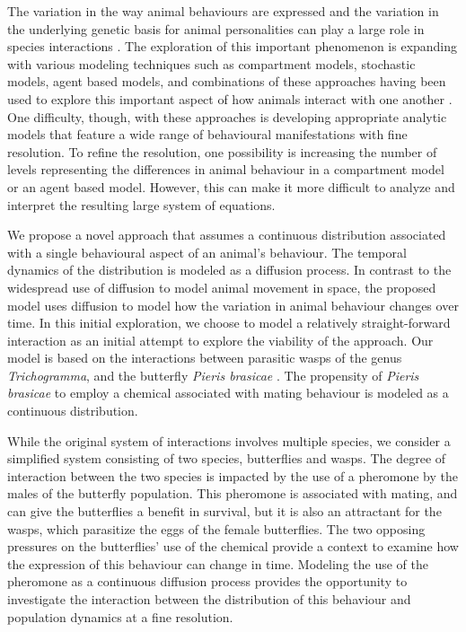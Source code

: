 \documentclass[review,authoryear]{elsarticle}
\begin{document}
The variation in the way animal behaviours are expressed and the variation in the underlying genetic basis for animal personalities can play a large role in species interactions \citep{doi:10.1111/j.1461-0248.2010.01536.x,doi:10.1086/687235,mierzejewski_horn_luong_2019,SANTICCHIA20191,doi:10.1098/rspb.2014.1016,FARINE2015609,sibbald2009individual,kurvers2011effect,modlmeier2012diverse,doi:10.1037/0735-7036.107.3.250}.   The exploration of this important phenomenon is expanding with various modeling techniques such as compartment models, stochastic
models, agent based models, and combinations of these
approaches having been used to explore this important aspect of how animals interact with one another \citep{Keeling65,doi:10.1086/687235,doi:10.1098/rspb.2001.1599,SuperspreadingLloyd}.  One difficulty, though, with these approaches is developing appropriate analytic models that feature a wide range of behavioural manifestations with fine resolution. To refine the resolution, one possibility is increasing the number of levels representing the differences in animal behaviour in a compartment model or an agent based model. However, this can make it more difficult to analyze and interpret the resulting large system of equations. 

We propose a novel approach that assumes a continuous distribution
associated with a single behavioural aspect of an animal's behaviour. The temporal dynamics of the distribution is modeled as a diffusion process. In contrast to the widespread use of diffusion to model animal movement in space, the proposed model uses diffusion to model how the variation in animal behaviour changes over time. In
this initial exploration, we choose to model a relatively
straight-forward interaction as an initial attempt to explore the viability of the approach. Our model is based on
the interactions between parasitic wasps of the genus
\textit{Trichogramma}, and the butterfly \textit{Pieris
  brasicae} \citep{10.1093/beheco/arq007}.  The propensity of
\textit{Pieris brasicae} to employ a chemical associated with mating
behaviour is modeled as a continuous distribution.

While the original system of interactions involves multiple species, we consider a simplified system consisting of two species, butterflies and wasps. The degree of interaction between the two species is impacted by the use of a pheromone by the males of the butterfly population. This pheromone is associated with mating, and can give the butterflies a benefit in survival, but it is also an attractant for the wasps, which parasitize the eggs of the female butterflies. The two opposing pressures on the butterflies' use of the chemical provide a context to examine how the expression of this behaviour can change in time. Modeling the use of the pheromone as a continuous diffusion process provides the opportunity to investigate the interaction between the distribution of this behaviour and population dynamics at a fine resolution.
\end{document}
